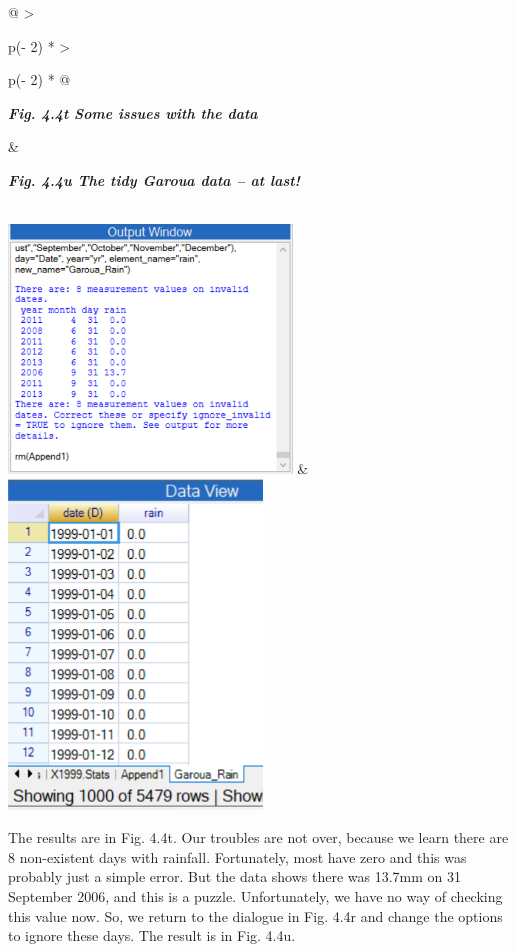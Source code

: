 \documentclass[
  letterpaper,
  DIV=11,
  numbers=noendperiod]{scrreprt}
\begin{document}
\begin{longtable}[]{@{}
  >{\raggedright\arraybackslash}p{(\columnwidth - 2\tabcolsep) * }
  >{\raggedright\arraybackslash}p{(\columnwidth - 2\tabcolsep) * }@{}}
\toprule\noalign{}
\begin{minipage}[b]{\linewidth}\raggedright
\textbf{\emph{Fig. 4.4t Some issues with the data}}
\end{minipage} & \begin{minipage}[b]{\linewidth}\raggedright
\textbf{\emph{Fig. 4.4u The tidy Garoua data -- at last!}}
\end{minipage} \\
\midrule\noalign{}
\endhead
\bottomrule\noalign{}
\endlastfoot
\includegraphics[width=2.96368in,height=2.59991in]{figures/Fig4.4t.png}
&
\includegraphics[width=2.65291in,height=3.45157in]{figures/Fig4.4u.png} \\
\end{longtable}

The results are in Fig. 4.4t. Our troubles are not over, because we
learn there are 8 non-existent days with rainfall. Fortunately, most
have zero and this was probably just a simple error. But the data shows
there was 13.7mm on 31 September 2006, and this is a puzzle.
Unfortunately, we have no way of checking this value now. So, we return
to the dialogue in Fig. 4.4r and change the options to ignore these
days. The result is in Fig. 4.4u.
\end{document}
